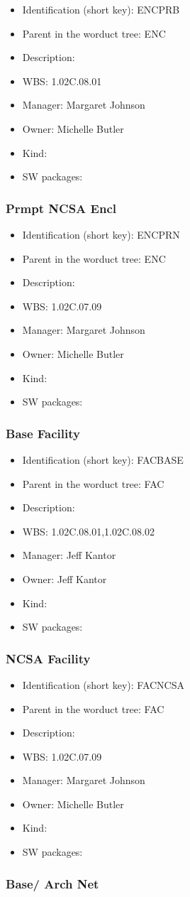 \begin{itemize}\item Identification (short key): ENCPRB
\item Parent in the worduct tree: ENC
\item Description: 
\item WBS: 1.02C.08.01
\item Manager: Margaret Johnson
\item Owner: Michelle Butler
\item Kind:
\item SW packages: 
\end{itemize}\subsubsection{Prmpt NCSA Encl}
\begin{itemize}\item Identification (short key): ENCPRN
\item Parent in the worduct tree: ENC
\item Description: 
\item WBS: 1.02C.07.09
\item Manager: Margaret Johnson
\item Owner: Michelle Butler
\item Kind:
\item SW packages: 
\end{itemize}\subsubsection{Base Facility}
\begin{itemize}\item Identification (short key): FACBASE
\item Parent in the worduct tree: FAC
\item Description: 
\item WBS: 1.02C.08.01,1.02C.08.02
\item Manager: Jeff Kantor
\item Owner: Jeff Kantor
\item Kind:
\item SW packages: 
\end{itemize}\subsubsection{NCSA Facility}
\begin{itemize}\item Identification (short key): FACNCSA
\item Parent in the worduct tree: FAC
\item Description: 
\item WBS: 1.02C.07.09
\item Manager: Margaret Johnson
\item Owner: Michelle Butler
\item Kind:
\item SW packages: 
\end{itemize}\subsubsection{Base/ Arch Net}
